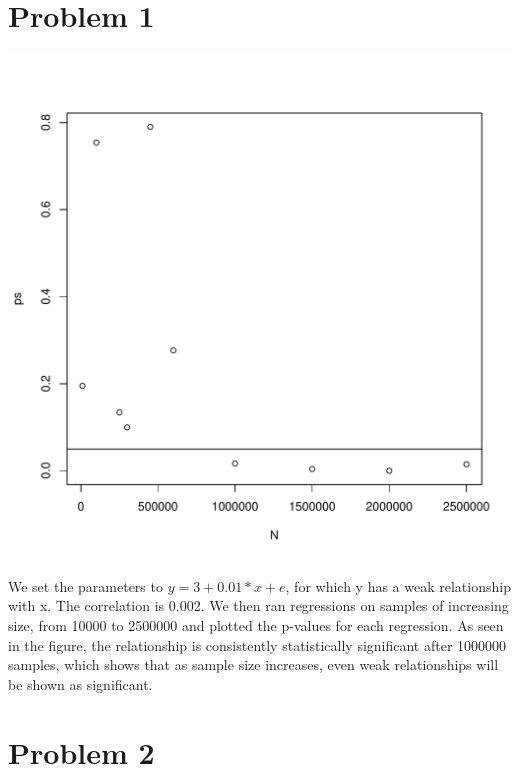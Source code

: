 \documentclass{article}\usepackage[]{graphicx}\usepackage[]{color}
\newenvironment{knitrout}{}{} %
\begin{document}
\section*{Problem 1}

\begin{knitrout}
\color{fgcolor}
\includegraphics[width=5.5in]{figure/p1-1} 

\end{knitrout}

\noindent We set the parameters to $y = 3 + 0.01*x + e$, for which y has a weak relationship with x.  The correlation is 0.002. We then ran regressions on samples of increasing size, from 10000 to 2500000 and plotted the p-values for each regression.  As seen in the figure, the relationship is consistently statistically significant after 1000000 samples, which shows that as sample size increases, even weak relationships will be shown as significant.


\section*{Problem 2}
\end{document}
